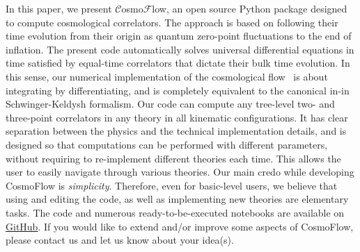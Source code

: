 \documentclass[11pt]{article}
\numberwithin{equation}{section} %
\begin{document}
\vskip 4pt
In this paper, we present \textcolor{pyblue}{$\bm{\mathcal{C}}$}\textsf{osmo}\textcolor{pyred}{$\bm{\mathcal{F}}$}\textsf{low}, an open source Python package designed to compute cosmological correlators. The approach is based on following their time evolution from their origin as quantum zero-point fluctuations to the end of inflation. The present code automatically solves universal differential equations in time satisfied by equal-time correlators that dictate their bulk time evolution. In this sense, our numerical implementation of the cosmological flow~\cite{Werth:2023pfl, Pinol:2023oux} is about integrating by differentiating, and is completely equivalent to the canonical in-in Schwinger-Keldysh formalism. Our code can compute any tree-level two- and three-point correlators in any theory in all kinematic configurations. It has clear separation between the physics and the technical implementation details, and is designed so that computations can be performed with different parameters, without requiring to re-implement different theories each time. This allows the user to easily navigate through various theories. Our main credo while developing \textsf{CosmoFlow} is \textit{simplicity}. Therefore, even for basic-level users, we believe that using and editing the code, as well as implementing new theories are elementary tasks. The code and numerous ready-to-be-executed notebooks are available on \href{https://github.com/deniswerth/CosmoFlow}{GitHub}. If you would like to extend and/or improve some aspects of \textsf{CosmoFlow}, please contact us and let us know about your idea(s).

\newpage
\end{document}
